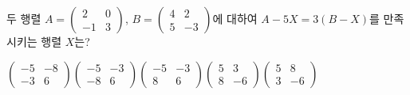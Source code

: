 \hspace*{2mm}\begin{minipage}[t]{\dimexpr\linewidth-2mm\relax}\vspace{0pt}
두 행렬 $A=\begin{pmatrix} 2 & 0 \\ -1 & 3 \end{pmatrix}$, $B=\begin{pmatrix} 4 & 2 \\ 5 & -3 \end{pmatrix}$에 대하여 $A-5X=3(B-X)$를 만족시키는 행렬 $X$는?
\begin{choices32}{$\begin{pmatrix} -5 & -8 \\ -3 & 6 \end{pmatrix}$}{$\begin{pmatrix} -5 & -3 \\ -8 & 6 \end{pmatrix}$}{$\begin{pmatrix} -5 & -3 \\ 8 & 6 \end{pmatrix}$}{$\begin{pmatrix} 5 & 3 \\ 8 & -6 \end{pmatrix}$}{$\begin{pmatrix} 5 & 8 \\ 3 & -6 \end{pmatrix}$}\end{choices32}\end{minipage}
